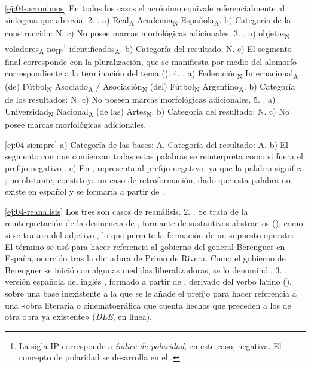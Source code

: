 \begin{solucion}{\ref{ej:04-acronimos}}
En todos los casos el acrónimo equivale referencialmente al sintagma que
abrevia. 2. . a) Real\textsubscript{A} Academia\textsubscript{N}
Española\textsubscript{A}. b) Categoría de la construcción: N. c) No posee marcas
morfológicas adicionales. 3. . a) objetos\textsubscript{N}
voladores\textsubscript{A} no\textsubscript{IP}\footnote{La sigla IP corresponde
a \textit{índice de polaridad}, en este caso, negativa. El concepto de
polaridad se desarrolla en el .} identificados\textsubscript{A}. b)
Categoría del resultado: N. c) El segmento final corresponde con la
pluralización, que se manifiesta por medio del alomorfo correspondiente a la
terminación del tema (). 4. . a)
Federación\textsubscript{N} Internacional\textsubscript{A} (de)
Fútbol\textsubscript{N} Asociado\textsubscript{A} / Asociación\textsubscript{N}
(del) Fútbol\textsubscript{N} Argentino\textsubscript{A}. b) Categoría de los
resultados: N. c) No poseen marcas morfológicas adicionales. 5. . a)
Universidad\textsubscript{N} Nacional\textsubscript{A} (de las)
Artes\textsubscript{N}. b) Categoría del resultado: N. c) No posee marcas
morfológicas adicionales.
\end{solucion}

\begin{solucion}{\ref{ej:04-siempre}}
a) Categoría de las bases: A. Categoría del resultado: A. b) El segmento
 con que comienzan todas estas palabras se reinterpreta como si fuera
el prefijo negativo . c) En ,  representa
al prefijo negativo, ya que la palabra significa ; no
obstante,  constituye un caso de retroformación, dado que esta
palabra no existe en español y se formaría a partir de .
\end{solucion}

\begin{solucion}{\ref{ej:04-reanalisis}}
Los tres son casos de reanálisis. 2. . Se trata de la
reinterpretación de la desinencia  de , formante de
sustantivos abstractos (), como si se tratara del
adjetivo , lo que permite la formación de un supuesto opuesto:
. El término se usó para hacer referencia al gobierno del
general Berenguer en España, ocurrido tras la dictadura de Primo de Rivera. Como
el gobierno de Berenguer se inició con algunas medidas liberalizadoras, se lo
denominó . 3. : versión española del inglés
, formado a partir de  , derivado del
verbo latino  (), sobre una base inexistente
 a la que se le añade el prefijo  para
hacer referencia a una «obra literaria o cinematográfica que cuenta hechos que
preceden a los de otra obra ya existente» (\textit{DLE}, en línea).
\end{solucion}

